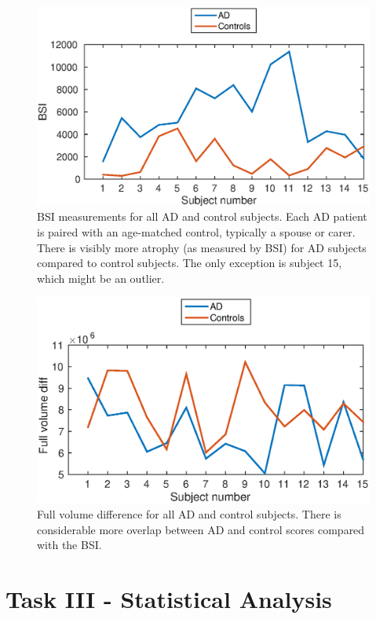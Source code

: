 \documentclass[11pt,a4paper,oneside]{report}
\begin{document}
\begin{figure}[H]
 \centering
 \includegraphics[scale=0.7]{figures/bsi_plot.eps}
 \caption{BSI measurements for all AD and control subjects. Each AD patient is paired with an age-matched control, typically a spouse or carer. \cite{malone2013miriad} There is visibly more atrophy (as measured by BSI) for AD subjects compared to control subjects. The only exception is subject 15, which might be an outlier.}
 \label{fig:bsi_plot}
\end{figure}

\begin{figure}[H]
 \centering
 \includegraphics[scale=0.7]{figures/fullVolumePlot.eps}
 \caption{Full volume difference for all AD and control subjects. There is considerable more overlap between AD and control scores compared with the BSI. }
 \label{fig:volumeDiff_plot}
\end{figure}



\section*{Task III - Statistical Analysis}
\end{document}
